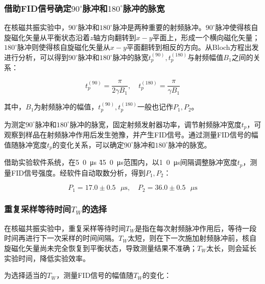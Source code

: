 \documentclass{thuemp}
\begin{document}
\subsubsection{借助FID信号确定$90^\circ$脉冲和$180^\circ$脉冲的脉宽}    

在核磁共振实验中，$90^\circ$脉冲和$180^\circ$脉冲是两种重要的射频脉冲。$90^\circ$脉冲使得核自旋磁化矢量从平衡状态沿着$z$轴方向翻转到$x-y$平面上，形成一个横向磁化矢量；$180^\circ$脉冲则使得核自旋磁化矢量从$x-y$平面翻转到相反的方向。从Bloch方程出发进行分析，可以得到$90^\circ$脉冲和$180^\circ$脉冲的脉宽$t_p^{(90)}, t_p^{(180)}$与射频幅值$B_1$之间的关系：

\begin{equation}
t_p^{(90)} = \frac{\pi}{2\gamma B_1}, \quad t_p^{(180)} = \frac{\pi}{\gamma B_1}
\label{eq:pulse_width}
\end{equation}

其中，$B_1$为射频脉冲的幅值，$t_p^{(90)}, t_p^{(180)}$一般也记作$P_1, P_2$。

为测定$90^\circ$脉冲和$180^\circ$脉冲的脉宽，固定射频发射器功率，调节射频脉冲宽度$t_p$，可观察到样品在射频脉冲作用后发生弛豫，并产生FID信号。通过测量FID信号的幅值随脉冲宽度$t_p$的变化关系，可以确定$90^\circ$脉冲和$180^\circ$脉冲的脉宽。

借助实验软件系统，在\si{5.0 \micro \second} \~ \si{45.0\micro \second}范围内，以\si{1.0\micro \second}间隔调整脉冲宽度$t_p$，测量FID信号强度。经软件自动取数分析，得到$P_1, P_2$：

\begin{equation}
    P_1 = 17.0 \pm 0.5 \text{ }\mu\text{s}, \quad P_2 = 36.0 \pm 0.5 \text{ }\mu\text{s}
\end{equation}

\subsubsection{重复采样等待时间$T_W$的选择}

在核磁共振实验中，重复采样等待时间$T_W$是指在每次射频脉冲作用后，等待一段时间再进行下一次采样的时间间隔。$T_W$太短，则在下一次施加射频脉冲前，核自旋磁化矢量尚未完全恢复到平衡状态，导致测量结果不准确；$T_W$太长，则会延长实验时间，降低实验效率。

为选择适当的$T_W$，测量FID信号的幅值随$T_W$的变化：
\end{document}

